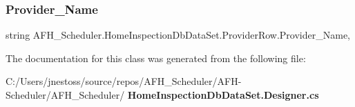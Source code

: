\mbox{\label{class_a_f_h___scheduler_1_1_home_inspection_db_data_set_1_1_provider_row_a78e408644810033da81c1f1b5799e78c}} 
\subsubsection{Provider\_Name}
{\footnotesize\ttfamily string A\+F\+H\+\_\+\+Scheduler.\+Home\+Inspection\+Db\+Data\+Set.\+Provider\+Row.\+Provider\+\_\+\+Name\hspace{0.3cm}{\ttfamily [get]}, {\ttfamily [set]}}



The documentation for this class was generated from the following file\+:\begin{DoxyCompactItemize}
\item 
C\+:/\+Users/jnestoss/source/repos/\+A\+F\+H\+\_\+\+Scheduler/\+A\+F\+H-\/\+Scheduler/\+A\+F\+H\+\_\+\+Scheduler/\textbf{ Home\+Inspection\+Db\+Data\+Set.\+Designer.\+cs}\end{DoxyCompactItemize}

